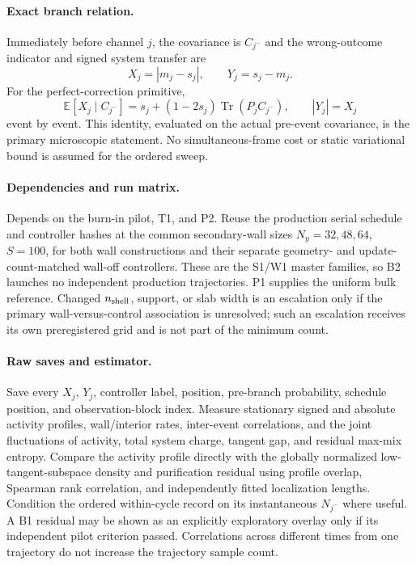 \documentclass[aps,prx,onecolumn,nofootinbib,superscriptaddress,longbibliography]{revtex4-2}
\newcommand{\E}{\mathbb{E}}
\newcommand{\qTr}{\operatorname{Tr}}
\begin{document}
\paragraph{Exact branch relation.}
Immediately before channel $j$, the covariance is $C_{j^-}$ and the wrong-outcome
indicator and signed system transfer are
\begin{equation}
 X_j=|m_j-s_j|,
 \qquad Y_j=s_j-m_j.
\end{equation}
For the perfect-correction primitive,
\begin{equation}
 \E[X_j\mid C_{j^-}]
 =s_j+(1-2s_j)\qTr(P_jC_{j^-}),
 \qquad |Y_j|=X_j
 \label{eq:activity-identity}
\end{equation}
event by event.  This identity, evaluated on the actual pre-event covariance, is the
primary microscopic statement.  No simultaneous-frame cost or static variational bound is
assumed for the ordered sweep.

\paragraph{Dependencies and run matrix.}
Depends on the burn-in pilot, T1, and P2.  Reuse the production serial schedule and
controller hashes at the common secondary-wall sizes $N_y=32,48,64$, $S=100$, for both
wall constructions and their separate geometry- and update-count-matched wall-off
controllers.  These are the S1/W1 master families, so B2 launches no independent
production trajectories.  P1 supplies the uniform bulk reference.  Changed
$n_{\rm shell}$, support, or slab width is an escalation only if the primary
wall-versus-control association is unresolved; such an escalation receives its own
preregistered grid and is not part of the minimum count.

\paragraph{Raw saves and estimator.}
Save every $X_j$, $Y_j$, controller label, position, pre-branch probability, schedule
position, and observation-block index.  Measure stationary signed and absolute activity
profiles, wall/interior rates, inter-event correlations, and the joint fluctuations of
activity, total system charge, tangent gap, and residual max-mix entropy.  Compare the
activity profile directly with the globally normalized low-tangent-subspace density and
purification residual using profile overlap, Spearman rank correlation, and independently
fitted localization lengths.  Condition the ordered within-cycle record on its
instantaneous $N_{j^-}$ where useful.  A B1 residual may be shown as an explicitly
exploratory overlay only if its independent pilot criterion passed.  Correlations across
different times from one trajectory do not increase the trajectory sample count.
\end{document}
